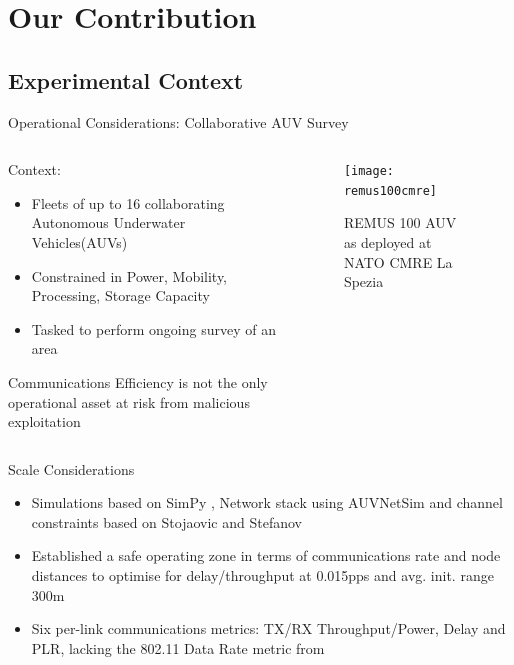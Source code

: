 \documentclass{beamer}
\begin{document}
\section{Our Contribution}

\subsection{Experimental Context}
\begin{frame}{Operational Considerations: Collaborative AUV Survey}
  \begin{columns}
    \begin{column}{0.5\textwidth}
      Context:
      \begin{itemize}
        \item Fleets of up to 16 collaborating Autonomous Underwater Vehicles(AUVs)
        \item Constrained in Power, Mobility, Processing, Storage Capacity
        \item Tasked to perform ongoing survey of an area
      \end{itemize}

    Communications Efficiency is not the only operational asset at risk from malicious exploitation
      
    \end{column}
    \begin{column}{0.5\textwidth}
      \begin{figure}[h]
        \begin{center}
          \texttt{[image: remus100cmre]}
        \end{center}
        \caption{REMUS 100 AUV as deployed at NATO CMRE La Spezia}
        \label{fig:remus100cmre}
      \end{figure}
      
    \end{column}
  \end{columns}
\end{frame}

\begin{frame}{Scale Considerations}
  \begin{itemize}
    \item Simulations based on SimPy \autocite{Mueller2003SimPy}, Network stack using AUVNetSim \autocite{Miquel2008} and channel constraints based on Stojaovic and Stefanov \autocite{Stojanovic2007,Stefanov2011}\hyperlink{tab:sysconstraints}{}
    \item Established a safe operating zone in terms of communications rate and node distances to optimise for delay/throughput at 0.015pps and avg. init. range 300m \hyperlink{eq:networkeffects}{}
    \item Six per-link communications metrics: TX/RX Throughput/Power, Delay and PLR, lacking the 802.11 Data Rate metric from \autocite{Guo11}  
    
  \end{itemize}

\end{frame}
\end{document}
